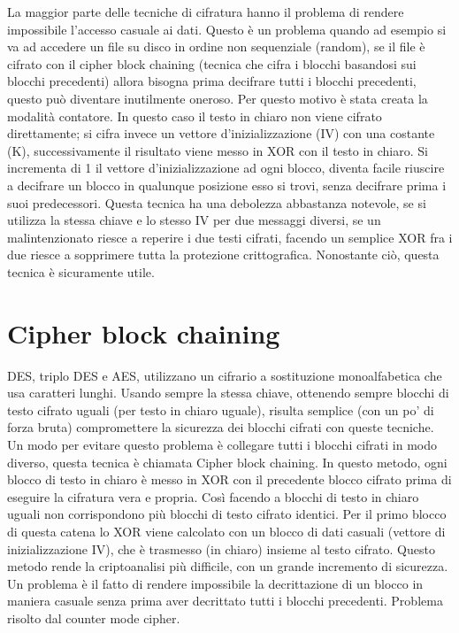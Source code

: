 La maggior parte delle tecniche di cifratura hanno il problema di rendere impossibile l’accesso casuale ai dati. Questo è un problema quando ad esempio si va ad accedere un file su disco in ordine non sequenziale (random), se il file è cifrato con il cipher block chaining (tecnica che cifra i blocchi basandosi sui blocchi precedenti) allora bisogna prima decifrare tutti i blocchi precedenti, questo può diventare inutilmente oneroso.
Per questo motivo è stata creata la modalità contatore. In questo caso il testo in chiaro non viene cifrato direttamente; si cifra invece un vettore d’inizializzazione (IV) con una costante (K), successivamente il risultato viene messo in XOR con il testo in chiaro. Si incrementa di 1 il vettore d’inizializzazione ad ogni blocco, diventa facile riuscire a decifrare un blocco in qualunque posizione esso si trovi, senza decifrare prima i suoi predecessori.
Questa tecnica ha una debolezza abbastanza notevole, se si utilizza la stessa chiave e lo stesso IV per due messaggi diversi, se un malintenzionato riesce a reperire i due testi cifrati, facendo un semplice XOR fra i due riesce a sopprimere tutta la protezione crittografica.
Nonostante ciò, questa tecnica è sicuramente utile.
 
\section{Cipher block chaining}

DES, triplo DES e AES, utilizzano un cifrario a sostituzione monoalfabetica che usa caratteri lunghi. Usando sempre la stessa chiave, ottenendo sempre blocchi di testo cifrato uguali (per testo in chiaro uguale), risulta semplice (con un po’ di forza bruta) compromettere la sicurezza dei blocchi cifrati con queste tecniche.
Un modo per evitare questo problema è collegare tutti i blocchi cifrati in modo diverso, questa tecnica è chiamata Cipher block chaining.
In questo metodo, ogni blocco di testo in chiaro è messo in XOR con il precedente blocco cifrato prima di eseguire la cifratura vera e propria.
Così facendo a blocchi di testo in chiaro uguali non corrispondono più blocchi di testo cifrato identici. Per il primo blocco di questa catena lo XOR viene calcolato con un blocco di dati casuali (vettore di inizializzazione IV), che è trasmesso (in chiaro) insieme al testo cifrato. 
Questo metodo rende la criptoanalisi più difficile, con un grande incremento di sicurezza. Un problema è il fatto di rendere impossibile la decrittazione di un blocco in maniera casuale senza prima aver decrittato tutti i blocchi precedenti. Problema risolto dal counter mode cipher.
 

